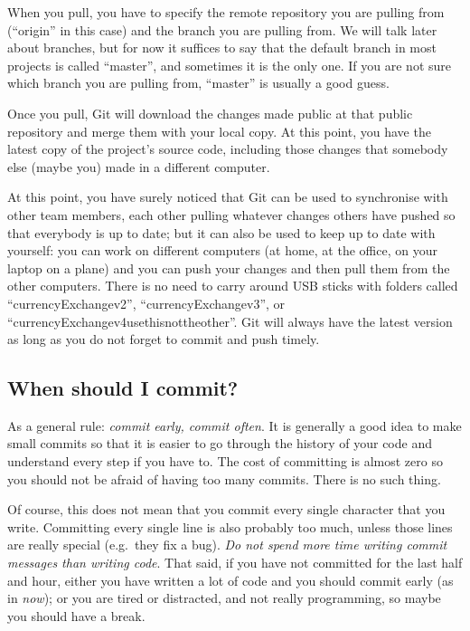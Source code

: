 When you pull, you have to specify the remote repository you are
pulling from (``origin'' in this case) and the branch you are pulling
from. We will talk later about branches, but for now it suffices to
say that the default branch in most projects is called ``master'', and
sometimes it is the only one. If you are not sure which branch you are
pulling from, ``master'' is usually a good guess.

Once you pull, Git will download the changes made public at that
public repository and merge them with your local copy. At this point,
you have the latest copy of the project's source code, including those
changes that somebody else (maybe you) made in a different computer. 

At this point, you have surely noticed that Git can be used to
synchronise with other team members, each other pulling whatever
changes others have pushed so that everybody is up to date; but it can
also be used to keep up to date with yourself: you can work on
different computers (at home, at the office, on your laptop on a
plane) and you can push your changes and then pull them from the other
computers. There is no need to carry around USB sticks with folders
called ``currencyExchangev2'', ``currencyExchangev3'', or
``currencyExchangev4usethisnottheother''. Git will always have the
latest version as long as you do not forget to commit and push
timely. 

\subsection{When should I commit?}
\label{sec:when-should-i}

As a general rule: \emph{commit early, commit often}. It is generally
a good idea to make small commits so that it is easier to go through
the history of your code and understand every step if you have to. The
cost of 
committing is almost zero so you should not be afraid of having too
many commits. There is no such thing. 

Of course, this does not mean that you commit every single character
that you write. Committing every single line is also probably too
much, unless those lines are really special (e.g.~they fix a bug). 
\emph{Do not spend more time
writing commit messages than writing code}. That said, if you have not
committed for the last half and hour, either you have written a lot of
code and you should commit early (as in \emph{now}); or you are tired
or distracted, and not really programming, so maybe you should have a
break.

